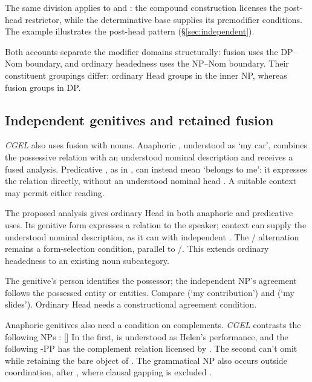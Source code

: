 \documentclass[12pt]{article}
\begin{document}
The same division applies to  and : the compound construction licenses the post-head restrictor, while the determinative base supplies its premodifier conditions. The example  illustrates the post-head pattern (§\ref{sec:independent}).

Both accounts separate the modifier domains structurally: fusion uses the DP--Nom boundary, and ordinary headedness uses the NP--Nom boundary. Their constituent groupings differ: ordinary Head groups  in the inner NP, whereas fusion groups  in DP.

\subsection{Independent genitives and retained fusion}\label{sec:genitive-head}

\textit{CGEL} also uses fusion with nouns. Anaphoric , understood as \enquote*{my car}, combines the possessive relation with an understood nominal description and receives a fused analysis. Predicative , as in , can instead mean \enquote*{belongs to me}: it expresses the relation directly, without an understood nominal head \citep[410--411, 469--471]{huddleston2002}. A suitable context may permit either reading.

The proposed analysis gives  ordinary Head in both anaphoric and predicative uses. Its genitive form expresses a relation to the speaker; context can supply the understood nominal description, as it can with independent . The / alternation remains a form-selection condition, parallel to /. This extends ordinary headedness to an existing noun subcategory.

The genitive's person identifies the possessor; the independent NP's agreement follows the possessed entity or entities. Compare  (\enquote*{my contribution}) and  (\enquote*{my slides}). Ordinary Head needs a constructional agreement condition.

Anaphoric genitives also need a condition on complements. \textit{CGEL} contrasts the following NPs \citep[420--421, (36ii), (37iib)]{huddleston2002}:
\ea\label{ex:genitive-complements}
\ea {} []
\ex {}
\z
\z
In the first,  is understood as Helen's performance, and the following -PP has the complement relation licensed by . The second can't omit  while retaining the bare object of . The grammatical NP also occurs outside coordination, after , where clausal gapping is excluded \citep[420--421, (37i)]{huddleston2002}.
\end{document}
